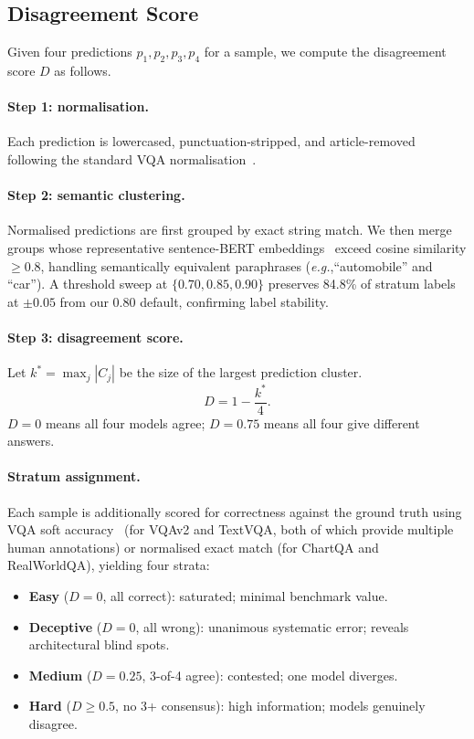 \documentclass[10pt,twocolumn,letterpaper]{article}
\newcommand{\eg}{\emph{e.g.},}
\begin{document}
\subsection{Disagreement Score}
\label{sec:disagree}

Given four predictions $p_1, p_2, p_3, p_4$ for a sample, we compute
the disagreement score $D$ as follows.

\paragraph{Step 1: normalisation.}
Each prediction is lowercased, punctuation-stripped, and article-removed
following the standard VQA normalisation~\cite{antol2015vqa}.

\paragraph{Step 2: semantic clustering.}
Normalised predictions are first grouped by exact string match.
We then merge groups whose representative sentence-BERT
embeddings~\cite{reimers2019sbert} exceed cosine similarity $\geq 0.8$,
handling semantically equivalent paraphrases (\eg ``automobile'' and ``car'').
A threshold sweep at $\{0.70, 0.85, 0.90\}$ preserves 84.8\% of stratum
labels at $\pm0.05$ from our 0.80 default, confirming label stability.

\paragraph{Step 3: disagreement score.}
Let $k^* = \max_j |C_j|$ be the size of the largest prediction cluster.
\begin{equation}
  D = 1 - \frac{k^*}{4}.
  \label{eq:disagree}
\end{equation}
$D=0$ means all four models agree; $D=0.75$ means all four give different
answers.

\paragraph{Stratum assignment.}
Each sample is additionally scored for correctness against the ground truth
using VQA soft accuracy~\cite{antol2015vqa} (for VQAv2 and TextVQA, both of
which provide multiple human annotations) or normalised exact match (for ChartQA
and RealWorldQA), yielding four strata:
\begin{itemize}[leftmargin=*,topsep=2pt,itemsep=0pt]
\item \textbf{Easy} ($D=0$, all correct): saturated; minimal benchmark value.
\item \textbf{Deceptive} ($D=0$, all wrong): unanimous systematic error;
  reveals architectural blind spots.
\item \textbf{Medium} ($D=0.25$, 3-of-4 agree): contested; one model diverges.
\item \textbf{Hard} ($D \geq 0.5$, no 3+ consensus): high information;
  models genuinely disagree.
\end{itemize}
\end{document}
